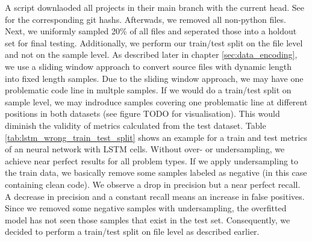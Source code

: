 A script downlaoded all projects in their main branch with the current head. See  for the corresponding git hashs. Afterwads, we removed all non-python files. 
Next, we uniformly sampled 20\% of all files and seperated those into a holdout set for final testing. Additionally, we perform our train/test split on the file level and not on the sample level. As described later in chapter \ref{sec:data_encoding}, we use a sliding window approach to convert source files with dynamic length into fixed length samples. Due to the sliding window approach, we may have one problematic code line in multple samples. If we would do a train/test split on sample level, we may indroduce samples covering one problematic line at different positions in both datasets (see figure TODO for visualisation). This would diminish the validity of metrics calculated from the test dataset. Table \ref{tab:lstm_wrong_train_test_split} shows an example for a train and test metrics of an neural network with LSTM cells. Without over- or undersampling, we achieve near perfect results for all problem types. If we apply undersampling to the train data, we basically remove some samples labeled as negative (in this case containing clean code). We observe a drop in precision but a near perfect recall.
A decrease in precision and a constant recall means an increase in false positives. Since we removed some negative samples with undersampling, the overfitted model has not seen those samples that exist in the test set. 
Consequently, we decided to perform a train/test split on file level as described earlier.
